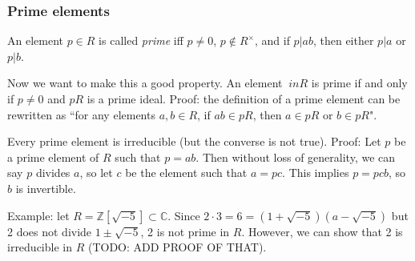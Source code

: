 \documentclass[12pt]{article}
\begin{document}
\subsubsection{Prime elements}
An element $p \in R$ is called \textit{prime} iff $p \neq 0$, $p \not\in R^\times$, and if $p|ab$, then either $p|a$ or $p|b$.
\par
Now we want to make this a good property. An element $\ in R$ is prime if and only if $p \neq 0$ and $pR$ is a prime ideal. Proof: the definition of a prime element can be rewritten as ``for any elements $a,b \in R$, if $ab\in pR$, then $a \in pR$ or $b \in pR$".
\par
Every prime element is irreducible (but the converse is not true). Proof: Let $p$ be a prime element of $R$ such that $p=ab$. Then without loss of generality, we can say $p$ divides $a$, so let $c$ be the element such that $a=pc$. This implies $p=pcb$, so $b$ is invertible.
\par
Example: let $R = \mathbb{Z}[\sqrt{-5}] \subset \mathbb{C}$. Since $2\cdot 3=6=(1+\sqrt{-5})(a-\sqrt{-5})$ but 2 does not divide $1 \pm \sqrt{-5}$, 2 is not prime in $R$. However, we can show that 2 is irreducible in $R$ (TODO: ADD PROOF OF THAT).
\end{document}
